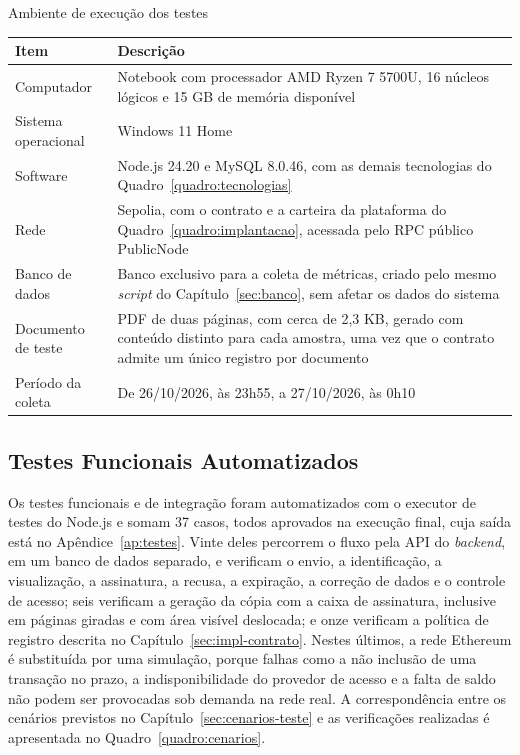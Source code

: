 \documentclass[
    12pt,
    a4paper,
    oneside,
    chapter=TITLE,
    section=TITLE,
    subsection=TITLE,
    subsubsection=TITLE,
    sumario=tradicional,
    english,
    brazil
]{abntex2}
\begin{document}
\begin{quadro}[htb]
    \caption{Ambiente de execução dos testes}
    \label{quadro:ambiente}
    \centering
    \small
    \begin{tabular}{L{4.0cm}L{10.8cm}}
        \toprule
        \textbf{Item} & \textbf{Descrição} \\
        \midrule
        Computador & Notebook com processador AMD Ryzen 7 5700U, 16 núcleos lógicos e 15 GB de memória disponível \\
        Sistema operacional & Windows 11 Home \\
        Software & Node.js 24.20 e MySQL 8.0.46, com as demais tecnologias do Quadro~\ref{quadro:tecnologias} \\
        Rede & Sepolia, com o contrato e a carteira da plataforma do Quadro~\ref{quadro:implantacao}, acessada pelo RPC público PublicNode \\
        Banco de dados & Banco exclusivo para a coleta de métricas, criado pelo mesmo \emph{script} do Capítulo~\ref{sec:banco}, sem afetar os dados do sistema \\
        Documento de teste & PDF de duas páginas, com cerca de 2,3 KB, gerado com conteúdo distinto para cada amostra, uma vez que o contrato admite um único registro por documento \\
        Período da coleta & De 26/10/2026, às 23h55, a 27/10/2026, às 0h10 \\
        \bottomrule
    \end{tabular}
\end{quadro}

\subsection{Testes Funcionais Automatizados}
\label{sec:res-funcionais}

Os testes funcionais e de integração foram automatizados com o executor de testes do Node.js e somam 37 casos, todos aprovados na execução final, cuja saída está no Apêndice~\ref{ap:testes}. Vinte deles percorrem o fluxo pela API do \emph{backend}, em um banco de dados separado, e verificam o envio, a identificação, a visualização, a assinatura, a recusa, a expiração, a correção de dados e o controle de acesso; seis verificam a geração da cópia com a caixa de assinatura, inclusive em páginas giradas e com área visível deslocada; e onze verificam a política de registro descrita no Capítulo~\ref{sec:impl-contrato}. Nestes últimos, a rede Ethereum é substituída por uma simulação, porque falhas como a não inclusão de uma transação no prazo, a indisponibilidade do provedor de acesso e a falta de saldo não podem ser provocadas sob demanda na rede real. A correspondência entre os cenários previstos no Capítulo~\ref{sec:cenarios-teste} e as verificações realizadas é apresentada no Quadro~\ref{quadro:cenarios}.
\end{document}
